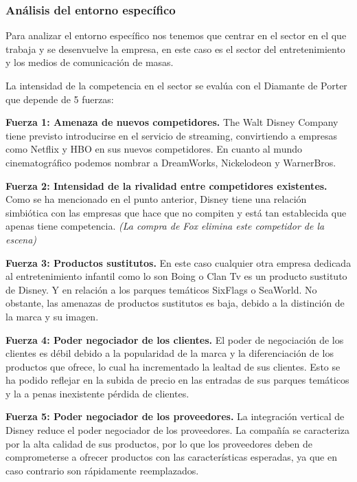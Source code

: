 \subsubsection{Análisis del entorno específico}
Para analizar el entorno específico nos tenemos que centrar en el sector en el que trabaja y se desenvuelve la empresa, en este caso es el sector del entretenimiento y los medios de comunicación de masas.

La intensidad de la competencia en el sector se evalúa con el Diamante de Porter que depende de 5 fuerzas:

\textbf{Fuerza 1: Amenaza de nuevos competidores.} The Walt Disney Company tiene previsto introducirse en el servicio de streaming, convirtiendo a empresas como Netflix y HBO en sus nuevos competidores. En cuanto al mundo cinematográfico podemos nombrar a DreamWorks, Nickelodeon y WarnerBros.

\textbf{Fuerza 2: Intensidad de la rivalidad entre competidores existentes.} Como se ha mencionado en el punto anterior, Disney tiene una relación simbiótica con las empresas que hace que no compiten y está tan establecida que apenas tiene competencia. \textit{(La compra de Fox elimina este competidor de la escena)}

\textbf{Fuerza 3: Productos sustitutos.} En este caso cualquier otra empresa dedicada al entretenimiento infantil como lo son Boing o Clan Tv es un producto sustituto de Disney. Y en relación a los parques temáticos SixFlags o SeaWorld. No obstante, las amenazas de productos sustitutos es baja, debido a la distinción de la marca y su imagen.

\textbf{Fuerza 4: Poder negociador de los clientes.} El poder de negociación de los clientes es débil debido a la popularidad de la marca y la diferenciación de los productos que ofrece, lo cual ha incrementado la lealtad de sus clientes. Esto se ha podido reflejar en la subida de precio en las entradas de sus parques temáticos y la a penas inexistente pérdida de clientes.

\textbf{Fuerza 5: Poder negociador de los proveedores.} La integración vertical de Disney reduce el poder negociador de los proveedores. La compañía se caracteriza por la alta calidad de sus productos, por lo que los proveedores deben de comprometerse a ofrecer productos con las características esperadas, ya que en caso contrario son rápidamente reemplazados.